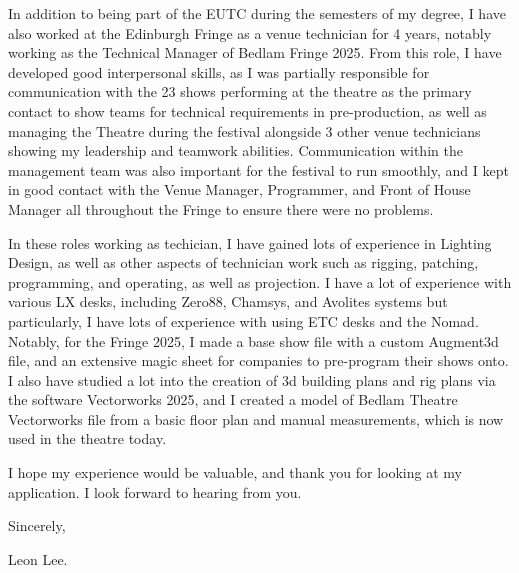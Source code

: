 \documentclass[10pt,english]{article}
\begin{document}
\medskip

In addition to being part of the EUTC during the semesters of my degree, I have also worked at the Edinburgh Fringe as a venue technician for 4 years, notably working as the Technical Manager of Bedlam Fringe 2025. From this role, I have developed good interpersonal skills, as I was partially responsible for communication with the 23 shows performing at the theatre as the primary contact to show teams for technical requirements in pre-production, as well as managing the Theatre during the festival alongside 3 other venue technicians showing my leadership and teamwork abilities. Communication within the management team was also important for the festival to run smoothly, and I kept in good contact with the Venue Manager, Programmer, and Front of House Manager all throughout the Fringe to ensure there were no problems. 

\medskip
In these roles working as techician, I have gained lots of experience in Lighting Design, as well as other aspects of technician work such as rigging, patching, programming, and operating, as well as projection. I have a lot of experience with various LX desks, including Zero88, Chamsys, and Avolites systems but particularly, I have lots of experience with using ETC desks and the Nomad. Notably, for the Fringe 2025, I made a base show file with a custom Augment3d file, and an extensive magic sheet for companies to pre-program their shows onto. I also have studied a lot into the creation of 3d building plans and rig plans via the software Vectorworks 2025, and I created a model of Bedlam Theatre Vectorworks file from a basic floor plan and manual measurements, which is now used in the theatre today.

\medskip

I hope my experience would be valuable, and thank you for looking at my application. I look forward to hearing from you.

\medskip
Sincerely,

Leon Lee.
\end{document}
